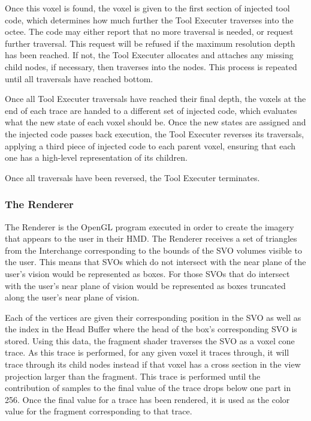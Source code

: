 \documentclass[onecolumn, draftclsnofoot,10pt, compsoc]{IEEEtran}
\begin{document}
Once this voxel is found, the voxel is given to the first section of injected tool code, which determines how much further the Tool Executer traverses into the octee. The code may either report that no more traversal is needed, or request further traversal. This request will be refused if the maximum resolution depth has been reached. If not, the Tool Executer allocates and attaches any missing child nodes, if necessary, then traverses into the nodes. This process is repeated until all traversals have reached bottom.

Once all Tool Executer traversals have reached their final depth, the voxels at the end of each trace are handed to a different set of injected code, which evaluates what the new state of each voxel should be. Once the new states are assigned and the injected code passes back execution, the Tool Executer reverses its traversals, applying a third piece of injected code to each parent voxel, ensuring that each one has a high-level representation of its children.

Once all traversals have been reversed, the Tool Executer terminates.\\


\subsubsection{The Renderer}

The Renderer is the OpenGL program executed in order to create the imagery that appears to the user in their HMD. The Renderer receives a set of triangles from the Interchange corresponding to the bounds of the SVO volumes visible to the user. This means that SVOs which do not intersect with the near plane of the user’s vision would be represented as boxes. For those SVOs that do intersect with the user’s near plane of vision would be represented as boxes truncated along the user’s near plane of vision.

Each of the vertices are given their corresponding position in the SVO as well as the index in the Head Buffer where the head of the box’s corresponding SVO is stored. Using this data, the fragment shader traverses the SVO as a voxel cone trace. As this trace is performed, for any given voxel it traces through, it will trace through its child nodes instead if that voxel has a cross section in the view projection larger than the fragment. This trace is performed until the contribution of samples to the final value of the trace drops below one part in 256. Once the final value for a trace has been rendered, it is used as the color value for the fragment corresponding to that trace.\\
\end{document}
